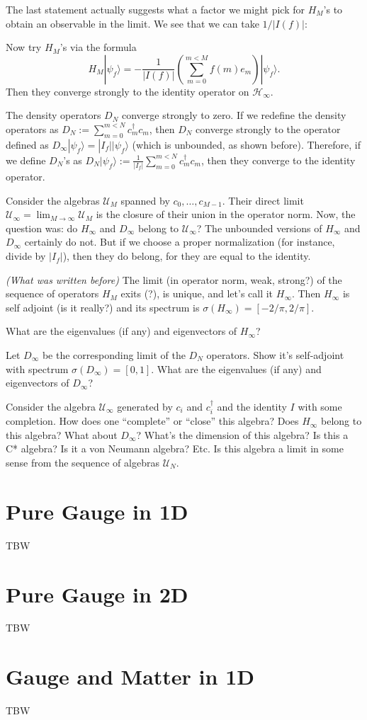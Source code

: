 The last statement actually suggests what a factor we might pick for $H_{M}$'s to obtain an observable in the limit. We see that we can take $1/|I(f)|$:
\begin{statement}
Now try $H_M$'s via the formula
\[
H_M|\psi_f\rangle = -\frac{1}{|I(f)|} \left(\sum_{m=0}^{m < M} f(m)e_m\right)|\psi_f\rangle.
\]
Then they converge strongly to the identity operator on $\mathcal H_{\infty}$.
\end{statement}
\begin{statement}
The density operators $D_N$ converge strongly to zero. If we redefine the density operators as $D_N := \sum_{m=0}^{m < N} c_m^\dagger c_m$, then $D_N$ converge strongly to the operator defined as $D_{\infty}|\psi_f\rangle = |I_f||\psi_f\rangle$ (which is unbounded, as shown before). Therefore, if we define $D_{N}$'s as $D_{N}|\psi_f\rangle := \frac{1}{|I_f|}\sum_{m=0}^{m < N} c_m^\dagger c_m$, then they converge to the identity operator.
\end{statement}

\begin{statement}
Consider the algebras $\mathcal U_M$ spanned by $c_0,\ldots,c_{M-1}$. Their direct limit $\mathcal U_{\infty} = \lim_{M \rightarrow \infty} \mathcal U_M$ is the closure of their union in the operator norm. Now, the question was: do $H_{\infty}$ and $D_{\infty}$ belong to $\mathcal U_{\infty}$? The unbounded versions of $H_{\infty}$ and $D_{\infty}$ certainly do not. But if we choose a proper normalization (for instance, divide by $|I_f|$), then they do belong, for they are equal to the identity.
\end{statement}

\emph{(What was written before) }The limit (in operator norm, weak, strong?) of the sequence of operators $H_M$ exits (?), is unique, and let's call it $H_\infty$.
 	 	Then $H_\infty$ is self adjoint (is it really?) and its spectrum is $\sigma(H_\infty) = [-2/\pi, 2/\pi]$.
 	 	
 	 	What are the eigenvalues (if any) and eigenvectors of $H_\infty$?
 	 	
 	 	Let $D_\infty$ be the corresponding limit of the $D_N$ operators. Show it's self-adjoint with spectrum $\sigma(D_\infty) = [0, 1]$.
 	 	What are the eigenvalues (if any) and eigenvectors of $D_\infty$?
 	 	
 	 Consider the algebra $\mathcal{U}_\infty$ generated by $c_i$ and $c^\dagger_i$ and the identity $I$ with some completion.
 	 How does one ``complete'' or ``close'' this algebra?
 	 Does $H_\infty$ belong to this algebra? What about $D_\infty$?
 	 What's the dimension of this algebra? Is this a C* algebra? Is it a von Neumann algebra? Etc.
 	 Is this algebra a limit in some sense from the sequence of algebras $\mathcal{U}_N$.
	\section{Pure Gauge in 1D}
TBW
	
	\section{Pure Gauge in 2D}
	TBW
	\section{Gauge and Matter in 1D}
	TBW
	
	
